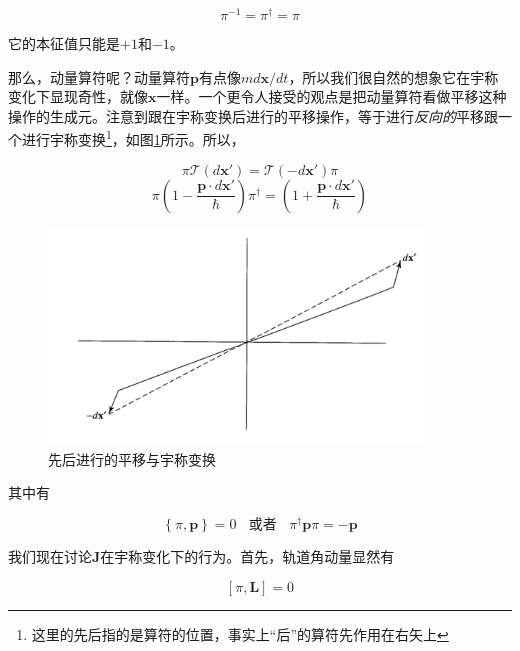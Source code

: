 \documentclass[UTF8,twoside]{ctexart}
\begin{document}
\begin{equation}
\pi^{-1} = \pi^{\dagger} = \pi
\end{equation}

\noindent 它的本征值只能是$+1$和$-1$。

那么，动量算符呢？动量算符$\bm p$有点像$md\bm{x}/dt$，所以我们很自然的想象它在宇称变化下显现奇性，就像$\bm x$一样。一个更令人接受的观点是把动量算符看做平移这种操作的生成元。注意到跟在宇称变换后进行的平移操作，等于进行{\emph{反向的}}平移跟一个进行宇称变换\footnote{这里的先后指的是算符的位置，事实上“后”的算符先作用在右矢上}，如图{\ref{Fig4.2}}所示。所以，

\begin{equation}
\pi \mathcal{T}(d\bm x') = \mathcal{T}(-d\bm x')\pi
\end{equation}
\begin{equation}
\pi \left(1 - \frac{\bm p \cdot d\bm x'}{\hbar}\right) \pi^{\dagger} = \left(1 + \frac{\bm p \cdot d\bm x'}{\hbar}\right)
\end{equation}

\begin{figure}
\begin{centering}
\includegraphics[width = 10cm]{./Sakurai/Fig_4.2.png}
\caption{先后进行的平移与宇称变换}
\label {Fig4.2}
\end{centering}
\end{figure}

\noindent 其中有

\begin{equation} \label{4.2.10}
\left\{\pi, \bm p\right\} = 0\ \ \ \ \text{或者}\ \ \ \ \pi^{\dagger} \bm{p} \pi = -\bm p
\end{equation}

我们现在讨论$\bm J$在宇称变化下的行为。首先，轨道角动量显然有

\begin{equation} \label{4.2.11}
\left[\pi, \bm L\right] = 0
\end{equation}
\end{document}
